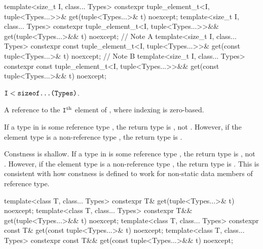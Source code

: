 %
\begin{itemdecl}
template<size_t I, class... Types>
  constexpr tuple_element_t<I, tuple<Types...>>&
    get(tuple<Types...>& t) noexcept;
template<size_t I, class... Types>
  constexpr tuple_element_t<I, tuple<Types...>>&&
    get(tuple<Types...>&& t) noexcept;        // Note A
template<size_t I, class... Types>
  constexpr const tuple_element_t<I, tuple<Types...>>&
    get(const tuple<Types...>& t) noexcept;   // Note B
template<size_t I, class... Types>
  constexpr const tuple_element_t<I, tuple<Types...>>&& get(const tuple<Types...>&& t) noexcept;
\end{itemdecl}

\begin{itemdescr}
\pnum
\mandates
$\texttt{I} < \texttt{sizeof...(Types)}$.

\pnum
\returns
A reference to the $\texttt{I}^\text{th}$ element of , where
indexing is zero-based.

\pnum
\begin{note}
[Note A]
If a type  in  is some reference type ,
the return type is , not .
However, if the element type is a non-reference type ,
the return type is .
\end{note}

\pnum
\begin{note}
[Note B]
Constness is shallow.
If a type  in  is some reference type ,
the return type is , not .
However, if the element type is a non-reference type ,
the return type is .
This is consistent with how constness is defined to work
for non-static data members of reference type.
\end{note}
\end{itemdescr}

%
\begin{itemdecl}
template<class T, class... Types>
  constexpr T& get(tuple<Types...>& t) noexcept;
template<class T, class... Types>
  constexpr T&& get(tuple<Types...>&& t) noexcept;
template<class T, class... Types>
  constexpr const T& get(const tuple<Types...>& t) noexcept;
template<class T, class... Types>
  constexpr const T&& get(const tuple<Types...>&& t) noexcept;
\end{itemdecl}

